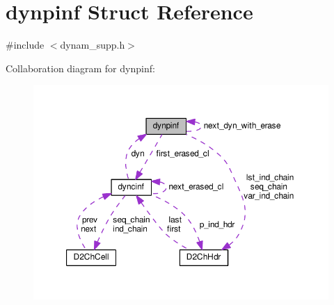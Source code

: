 \hypertarget{structdynpinf}{}\section{dynpinf Struct Reference}
\label{structdynpinf}


{\ttfamily \#include $<$dynam\+\_\+supp.\+h$>$}



Collaboration diagram for dynpinf\+:\nopagebreak
\begin{figure}[H]
\begin{center}
\leavevmode
\includegraphics[width=350pt]{structdynpinf__coll__graph}
\end{center}
\end{figure}
